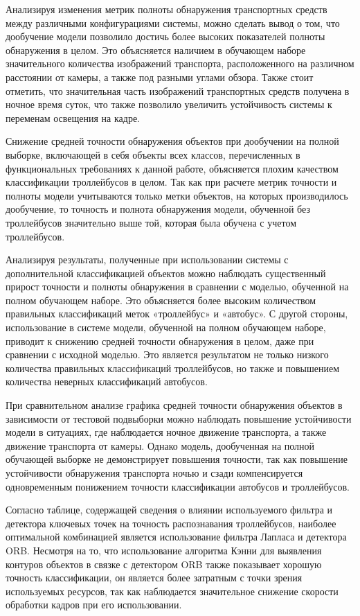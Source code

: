 Анализируя изменения метрик полноты обнаружения транспортных средств между различными конфигурациями системы, можно сделать вывод о том, что дообучение модели позволило достичь более высоких показателей полноты обнаружения в целом. Это объясняется наличием в обучающем наборе значительного количества изображений транспорта, расположенного на различном расстоянии от камеры, а также под разными углами обзора. Также стоит отметить, что значительная часть изображений транспортных средств получена в ночное время суток, что также позволило увеличить устойчивость системы к переменам освещения на кадре. 

Снижение средней точности обнаружения объектов при дообучении на полной выборке, включающей в себя объекты всех классов, перечисленных в функциональных требованиях к данной работе, объясняется плохим качеством классификации троллейбусов в целом. Так как при расчете метрик точности и полноты модели учитываются только метки объектов, на которых производилось дообучение, то точность и полнота обнаружения модели, обученной без троллейбусов значительно выше той, которая была обучена с учетом троллейбусов.

Анализируя результаты, полученные при использовании системы с дополнительной классификацией объектов можно наблюдать существенный прирост точности и полноты обнаружения в сравнении с моделью, обученной на полном обучающем наборе. Это объясняется более высоким количеством правильных классификаций меток «троллейбус» и «автобус». С другой стороны, использование в системе модели, обученной на полном обучающем наборе, приводит к снижению средней точности обнаружения в целом, даже при сравнении с исходной моделью. Это является результатом не только низкого количества правильных классификаций троллейбусов, но также и повышением количества неверных классификаций автобусов.

При сравнительном анализе графика средней точности обнаружения объектов в зависимости от тестовой подвыборки можно наблюдать повышение устойчивости модели в ситуациях, где наблюдается ночное движение транспорта, а также движение транспорта от камеры. Однако модель, дообученная на полной обучающей выборке не демонстрирует повышения точности, так как повышение устойчивости обнаружения транспорта ночью и сзади компенсируется одновременным понижением точности классификации автобусов и троллейбусов.

Согласно таблице, содержащей сведения о влиянии используемого фильтра и детектора ключевых точек на точность распознавания троллейбусов, наиболее оптимальной комбинацией является использование фильтра Лапласа и детектора ORB. Несмотря на то, что использование алгоритма Кэнни для выявления контуров объектов в связке с детектором ORB также показывает хорошую точность классификации, он является более затратным с точки зрения используемых ресурсов, так как наблюдается значительное снижение скорости обработки кадров при его использовании.










